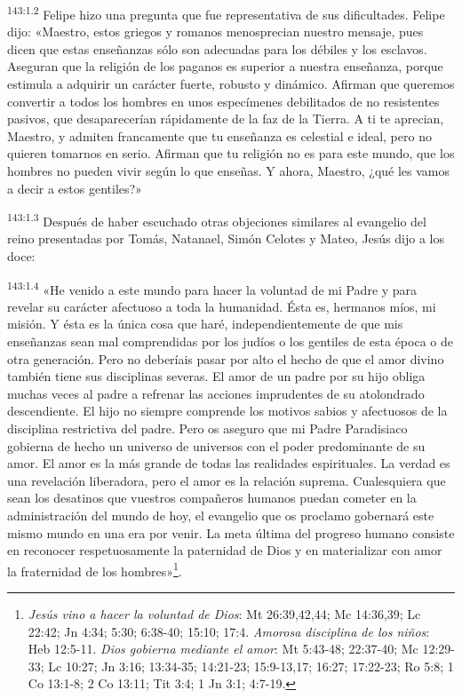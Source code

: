 \par 
\textsuperscript{143:1.2} Felipe hizo una pregunta que fue representativa de sus dificultades. Felipe dijo: «Maestro, estos griegos y romanos menosprecian nuestro mensaje, pues dicen que estas enseñanzas sólo son adecuadas para los débiles y los esclavos. Aseguran que la religión de los paganos es superior a nuestra enseñanza, porque estimula a adquirir un carácter fuerte, robusto y dinámico. Afirman que queremos convertir a todos los hombres en unos especímenes debilitados de no resistentes pasivos, que desaparecerían rápidamente de la faz de la Tierra. A ti te aprecian, Maestro, y admiten francamente que tu enseñanza es celestial e ideal, pero no quieren tomarnos en serio. Afirman que tu religión no es para este mundo, que los hombres no pueden vivir según lo que enseñas. Y ahora, Maestro, ¿qué les vamos a decir a estos gentiles?»

\par 
\textsuperscript{143:1.3} Después de haber escuchado otras objeciones similares al evangelio del reino presentadas por Tomás, Natanael, Simón Celotes y Mateo, Jesús dijo a los doce:

\par 
\textsuperscript{143:1.4} «He venido a este mundo para hacer la voluntad de mi Padre y para revelar su carácter afectuoso a toda la humanidad. Ésta es, hermanos míos, mi misión. Y ésta es la única cosa que haré, independientemente de que mis enseñanzas sean mal comprendidas por los judíos o los gentiles de esta época o de otra generación. Pero no deberíais pasar por alto el hecho de que el amor divino también tiene sus disciplinas severas. El amor de un padre por su hijo obliga muchas veces al padre a refrenar las acciones imprudentes de su atolondrado descendiente. El hijo no siempre comprende los motivos sabios y afectuosos de la disciplina restrictiva del padre. Pero os aseguro que mi Padre Paradisiaco gobierna de hecho un universo de universos con el poder predominante de su amor. El amor es la más grande de todas las realidades espirituales. La verdad es una revelación liberadora, pero el amor es la relación suprema. Cualesquiera que sean los desatinos que vuestros compañeros humanos puedan cometer en la administración del mundo de hoy, el evangelio que os proclamo gobernará este mismo mundo en una era por venir. La meta última del progreso humano consiste en reconocer respetuosamente la paternidad de Dios y en materializar con amor la fraternidad de los hombres»\footnote{\textit{Jesús vino a hacer la voluntad de Dios}: Mt 26:39,42,44; Mc 14:36,39; Lc 22:42; Jn 4:34; 5:30; 6:38-40; 15:10; 17:4. \textit{Amorosa disciplina de los niños}: Heb 12:5-11. \textit{Dios gobierna mediante el amor}: Mt 5:43-48; 22:37-40; Mc 12:29-33; Lc 10:27; Jn 3:16; 13:34-35; 14:21-23; 15:9-13,17; 16:27; 17:22-23; Ro 5:8; 1 Co 13:1-8; 2 Co 13:11; Tit 3:4; 1 Jn 3:1; 4:7-19.}.

